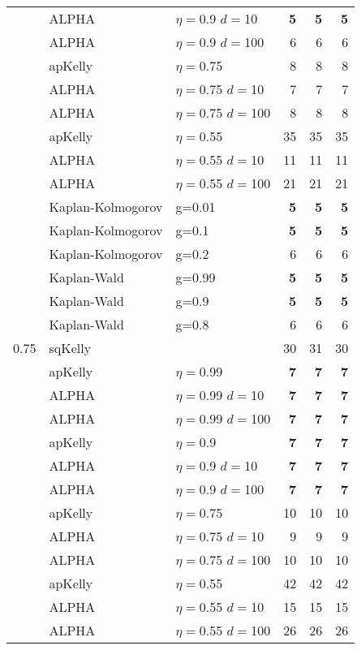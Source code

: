 \documentclass[12pt,runningheads]{llncs}
\begin{document}
{\begin{table}
\begin{tabular}{lll|rrr}
\cline{2-6}
& ALPHA & $\eta=$0.9 $d=$10 & \bf{5}  & \bf{5}  & \bf{5}  \\
& ALPHA & $\eta=$0.9 $d=$100 & 6  & 6  & 6  \\
\cline{2-6} & apKelly & $\eta=$0.75 & 8  & 8  & 8  \\
\cline{2-6}
& ALPHA & $\eta=$0.75 $d=$10 & 7  & 7  & 7  \\
& ALPHA & $\eta=$0.75 $d=$100 & 8  & 8  & 8  \\
\cline{2-6} & apKelly & $\eta=$0.55 & 35  & 35  & 35  \\
\cline{2-6}
& ALPHA & $\eta=$0.55 $d=$10 & 11  & 11  & 11  \\
& ALPHA & $\eta=$0.55 $d=$100 & 21  & 21  & 21  \\
\cline{2-6}
 & Kaplan-Kolmogorov & g=0.01 & \bf{5}  & \bf{5}  & \bf{5}  \\
 & Kaplan-Kolmogorov & g=0.1 & \bf{5}  & \bf{5}  & \bf{5}  \\
 & Kaplan-Kolmogorov & g=0.2 & 6  & 6  & 6  \\
\cline{2-6}
 & Kaplan-Wald & g=0.99 & \bf{5}  & \bf{5}  & \bf{5}  \\
 & Kaplan-Wald & g=0.9 & \bf{5}  & \bf{5}  & \bf{5}  \\
 & Kaplan-Wald & g=0.8 & 6  & 6  & 6  \\
\hline 0.75 & sqKelly & & 30  & 31  & 30  \\
\cline{2-6} & apKelly & $\eta=$0.99 & \bf{7}  & \bf{7}  & \bf{7}  \\
\cline{2-6}
& ALPHA & $\eta=$0.99 $d=$10 & \bf{7}  & \bf{7}  & \bf{7}  \\
& ALPHA & $\eta=$0.99 $d=$100 & \bf{7}  & \bf{7}  & \bf{7}  \\
\cline{2-6} & apKelly & $\eta=$0.9 & \bf{7}  & \bf{7}  & \bf{7}  \\
\cline{2-6}
& ALPHA & $\eta=$0.9 $d=$10 & \bf{7}  & \bf{7}  & \bf{7}  \\
& ALPHA & $\eta=$0.9 $d=$100 & \bf{7}  & \bf{7}  & \bf{7}  \\
\cline{2-6} & apKelly & $\eta=$0.75 & 10  & 10  & 10  \\
\cline{2-6}
& ALPHA & $\eta=$0.75 $d=$10 & 9  & 9  & 9  \\
& ALPHA & $\eta=$0.75 $d=$100 & 10  & 10  & 10  \\
\cline{2-6} & apKelly & $\eta=$0.55 & 42  & 42  & 42  \\
\cline{2-6}
& ALPHA & $\eta=$0.55 $d=$10 & 15  & 15  & 15  \\
& ALPHA & $\eta=$0.55 $d=$100 & 26  & 26  & 26  \\

\end{tabular}
\end{table}}
\end{document}
